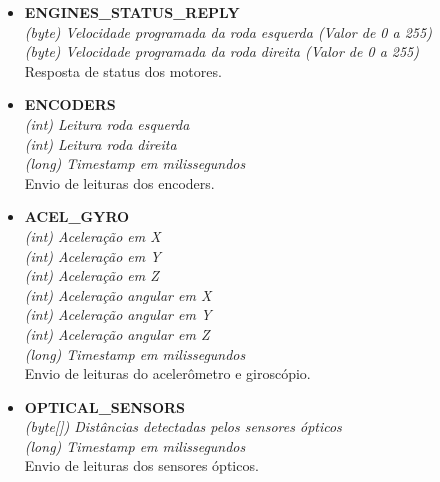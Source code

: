 \begin{itemize}
\begin{itemize}
      \item \textbf{ENGINES\_STATUS\_REPLY} \\
	\textit{(byte) Velocidade programada da roda esquerda (Valor de 0 a 255) }\\
	\textit{(byte) Velocidade programada da roda direita (Valor de 0 a 255)}\\
	Resposta de status dos motores.

      \item \textbf{ENCODERS} \\
	\textit{(int) Leitura roda esquerda }\\
	\textit{(int) Leitura roda direita }\\
	\textit{(long) Timestamp em milissegundos}\\
	Envio de leituras dos encoders.

      \item \textbf{ACEL\_GYRO} \\
	\textit{(int) Aceleração em X }\\
	\textit{(int) Aceleração em Y }\\
	\textit{(int) Aceleração em Z }\\
	\textit{(int) Aceleração angular em X }\\
	\textit{(int) Aceleração angular em Y }\\
	\textit{(int) Aceleração angular em Z }\\
	\textit{(long) Timestamp em milissegundos}\\
	Envio de leituras do acelerômetro e giroscópio.

      \item \textbf{OPTICAL\_SENSORS} \\
	\textit{(byte[]) Distâncias detectadas pelos sensores ópticos} \\
	\textit{(long) Timestamp em milissegundos}\\
	Envio de leituras dos sensores ópticos.

    \end{itemize}
\end{itemize}